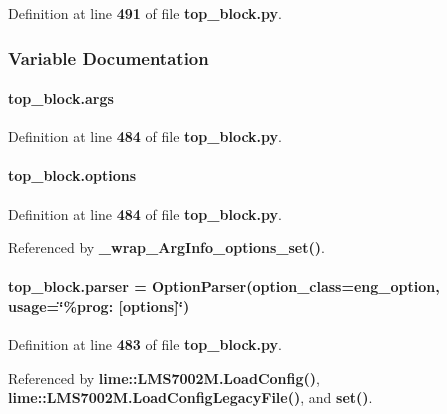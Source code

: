 Definition at line {\bf 491} of file {\bf top\+\_\+block.\+py}.



\subsubsection{Variable Documentation}
\paragraph[{args}]{\setlength{\rightskip}{0pt plus 5cm}top\+\_\+block.\+args}\label{namespacetop__block_acd00ed80e737b8ce236a271f8070871d}


Definition at line {\bf 484} of file {\bf top\+\_\+block.\+py}.

\paragraph[{options}]{\setlength{\rightskip}{0pt plus 5cm}top\+\_\+block.\+options}\label{namespacetop__block_af3a5594c22bb67b6c8b1b11b9acc790b}


Definition at line {\bf 484} of file {\bf top\+\_\+block.\+py}.



Referenced by {\bf \+\_\+wrap\+\_\+\+Arg\+Info\+\_\+options\+\_\+set()}.

\paragraph[{parser}]{\setlength{\rightskip}{0pt plus 5cm}top\+\_\+block.\+parser = Option\+Parser(option\+\_\+class=eng\+\_\+option, usage=\char`\"{}\%prog\+: [{\bf options}]\char`\"{})}\label{namespacetop__block_aff3fb2ea234aac87be58c0c562f7f8a5}


Definition at line {\bf 483} of file {\bf top\+\_\+block.\+py}.



Referenced by {\bf lime\+::\+L\+M\+S7002\+M.\+Load\+Config()}, {\bf lime\+::\+L\+M\+S7002\+M.\+Load\+Config\+Legacy\+File()}, and {\bf set()}.

